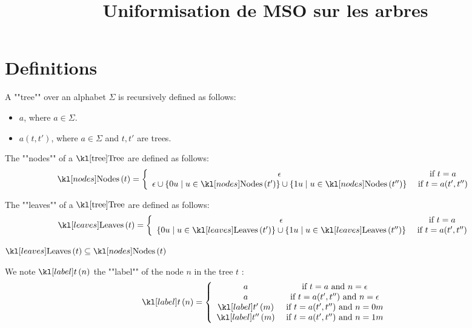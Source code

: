 \documentclass{article}
\begin{document}
\title{Uniformisation de MSO sur les arbres}

\maketitle

\section{Definitions}


\begin{definition}[Tree]
	A ""tree"" over an alphabet $\Sigma$ is recursively defined as follows:
	\begin{itemize}
		\item $a$, where $a \in \Sigma$.
		\item $a(t,t')$, where $a \in \Sigma$ and $t, t'$ are trees.
	\end{itemize}
\end{definition}

\begin{definition}[Nodes]
	The ""nodes"" of a $\tree$ are defined as follows:
	$$
		\nodes t = \left\{  \begin{array}{cc}
			\epsilon                                & \text{ if } t = a         \\
			\epsilon \cup \setdef {0u} {u \in \nodes {t'}}
			\cup \setdef {1u} {u \in \nodes {t''} } & \text{ if } t = a(t',t'')
		\end{array}
		\right.
	$$
\end{definition}


\begin{definition}[Leaves]
	The ""leaves"" of a $\tree$ are defined as follows:
	$$
		\leaves t = \left\{  \begin{array}{cc}
			\epsilon                                 & \text{ if } t = a         \\
			\setdef {0u} {u \in \leaves {t'}}
			\cup \setdef {1u} {u \in \leaves {t''} } & \text{ if } t = a(t',t'')
		\end{array}
		\right.
	$$
\end{definition}

\begin{remark}
	$\leaves t \subseteq \nodes t$
\end{remark}


\begin{notation}
	We note $\tlabel t n$ the ""label"" of the node $n$ in the tree $t$ :
	$$
		\tlabel t n = \left\{  \begin{array}{cc}
			a               & \text{ if } t = a \text{ and } n = \epsilon         \\
			a               & \text{ if } t = a(t',t'') \text{ and } n = \epsilon \\
			\tlabel {t'} m  & \text{ if } t = a(t',t'') \text{ and } n = 0m       \\
			\tlabel {t''} m & \text{ if } t = a(t',t'') \text{ and } n = 1m
		\end{array}
		\right.
	$$
\end{notation}
\end{document}
